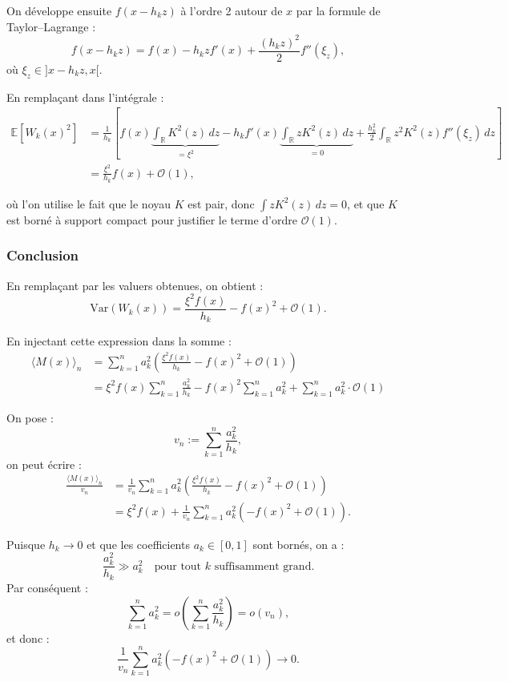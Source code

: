\documentclass[12pt]{article}
\begin{document}
On développe ensuite \( f(x - h_k z) \) à l’ordre 2 autour de \( x \) par la formule de Taylor–Lagrange :
\[
f(x - h_k z) = f(x) - h_k z f'(x) + \frac{(h_k z)^2}{2} f''(\xi_z),
\]
où \( \xi_z \in ]x - h_k z, x[ \).

En remplaçant dans l’intégrale :
\begin{align}
\mathbb{E}[W_k(x)^2] 
&= \frac{1}{h_k} \left[ f(x) \underbrace{\int_{\mathbb{R}} K^2(z) \, dz}_{= \xi^2}
- h_k f'(x) \underbrace{\int_{\mathbb{R}} z K^2(z) \, dz}_{= 0}
+ \frac{h_k^2}{2} \int_{\mathbb{R}} z^2 K^2(z) f''(\xi_z) \, dz \right] \\
&= \frac{\xi^2}{h_k} f(x) + \mathcal{O}(1),
\end{align}

où l’on utilise le fait que le noyau \( K \) est pair, donc \( \int z K^2(z) \, dz = 0 \), et que \( K \) est borné à support compact pour justifier le terme d’ordre \( \mathcal{O}(1) \).

\subsubsection*{Conclusion}
\setcounter{equation}{0}
En remplaçant par les valuers obtenues, on obtient :
\[
\mathrm{Var}(W_k(x)) = \frac{\xi^2 f(x)}{h_k} - f(x)^2 + \mathcal{O}(1).
\]

En injectant cette expression dans la somme :
\begin{align}
\langle M(x) \rangle_n 
&= \sum_{k=1}^n a_k^2 \left( \frac{\xi^2 f(x)}{h_k} - f(x)^2 + \mathcal{O}(1) \right) \\
&= \xi^2 f(x) \sum_{k=1}^n \frac{a_k^2}{h_k} 
- f(x)^2 \sum_{k=1}^n a_k^2 
+ \sum_{k=1}^n a_k^2 \cdot \mathcal{O}(1)
\end{align}

On pose :
\[
v_n := \sum_{k=1}^n \frac{a_k^2}{h_k},
\]
on peut écrire :
\begin{align}
\frac{\langle M(x) \rangle_n}{v_n}
&= \frac{1}{v_n} \sum_{k=1}^n a_k^2 \left( \frac{\xi^2 f(x)}{h_k} - f(x)^2 + \mathcal{O}(1) \right) \\
&= \xi^2 f(x) + \frac{1}{v_n} \sum_{k=1}^n a_k^2 \left( -f(x)^2 + \mathcal{O}(1) \right).
\end{align}

Puisque \( h_k \to 0 \) et que les coefficients \( a_k \in [0,1] \) sont bornés, on a :
\[
\frac{a_k^2}{h_k} \gg a_k^2 \quad \text{pour tout } k \text{ suffisamment grand}.
\]
Par conséquent :
\[
\sum_{k=1}^n a_k^2 = o\left( \sum_{k=1}^n \frac{a_k^2}{h_k} \right) = o(v_n),
\]
et donc :
\[
\frac{1}{v_n} \sum_{k=1}^n a_k^2 \left( -f(x)^2 + \mathcal{O}(1) \right) \longrightarrow 0.
\]
\end{document}
